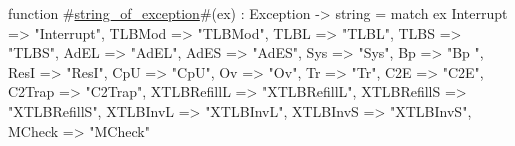 function #\hyperref[sailMIPSzstringzyofzyexception]{string\_of\_exception}#(ex) : Exception -> string =
   match ex {
      Interrupt    => "Interrupt",
      TLBMod       => "TLBMod",
      TLBL         => "TLBL",
      TLBS         => "TLBS",
      AdEL         => "AdEL",
      AdES         => "AdES",
      Sys          => "Sys",
      Bp           => "Bp  ",
      ResI         => "ResI",
      CpU          => "CpU",
      Ov           => "Ov",
      Tr           => "Tr",
      C2E          => "C2E",
      C2Trap       => "C2Trap",
      XTLBRefillL  => "XTLBRefillL",
      XTLBRefillS  => "XTLBRefillS",
      XTLBInvL     => "XTLBInvL",
      XTLBInvS     => "XTLBInvS",
      MCheck       => "MCheck"
   }

